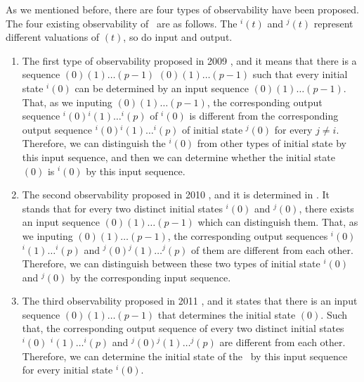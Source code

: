 As we mentioned before, there are four types of observability have been proposed. The four existing observability of \BCNs\ are as follows. The \State$^{i}(t)$ and \State$^{j}(t)$ represent different valuations of \State$(t)$, so do input and output. 


\begin{enumerate}
	\item The first type of observability proposed in 2009 \cite{cheng2009controllability}, and it means that there is a sequence \Input$(0)$\Input$(1)\ldots$\Input$(p-1)$
\Input$(0)$\Input$(1)\ldots$\Input$(p-1)$ such that
	every initial state \State$^{i}(0)$ can be determined by an input sequence \Input$(0)$\Input$(1)\ldots$\Input$(p-1)$. That, as we inputing \Input$(0)$\Input$(1)\ldots$\Input$(p-1)$, the corresponding output sequence \Output$^{i}(0)$\Output$^{i}(1)\ldots$\Output$^{i}(p)$ of \State$^{i}(0)$ is different from the corresponding output sequence \Output$^{i}(0)$\Output$^{i}(1)\ldots$\Output$^{i}(p)$ of initial state \State$^{j}(0)$ for every $j\ne i$. Therefore, we can distinguish the \State$^{i}(0)$ from other types of initial state by this input sequence, and then we can determine whether the initial state \State$(0)$ is \State$^{i}(0)$ by this input sequence.
	\item 
	The second observability proposed in 2010 \cite{Zhao2010Input}, and it is determined in \cite{Li2015Controllability}. It stands that for every two distinct initial states \State$^{i}(0)$ and \State$^{j}(0)$, there exists an input sequence \Input$(0)$\Input$(1)\ldots$\Input$(p-1)$ which can distinguish them. That, as we inputing \Input$(0)$\Input$(1)\ldots$\Input$(p-1)$, the corresponding output sequences \Output$^{i}(0)$\Output$^{i}(1)\ldots$\Output$^{i}(p)$ and \Output$^{j}(0)$\Output$^{j}(1)\ldots$\Output$^{j}(p)$ of them are different from each other. Therefore, we can distinguish between these two types of initial state \State$^{i}(0)$ and \State$^{j}(0)$ by the corresponding input sequence.	
	\item The third observability proposed in 2011 \cite{Cheng2011Identification}, and it states that there is an input sequence \Input$(0)$\Input$(1)\ldots$\Input$(p-1)$ that determines the initial state \State$(0)$. Such that, the corresponding output sequence of every two distinct initial states \Output$^{i}(0)$ \Output$^{i}(1)\ldots$\Output$^{i}(p)$ and \Output$^{j}(0)$\Output$^{j}(1)\ldots$\Output$^{j}(p)$ are different from each other. Therefore, we can determine the initial state of the \BCN\ by this input sequence for every initial state \State$^{i}(0)$.
	

\end{enumerate}
